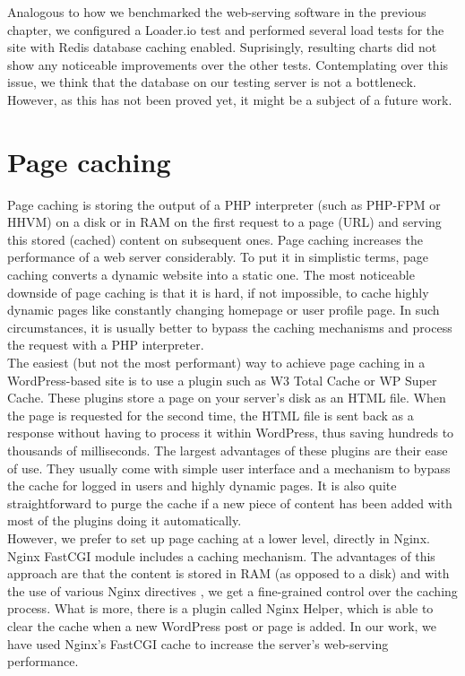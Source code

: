 Analogous to how we benchmarked the web-serving software in the previous chapter, we configured a Loader.io test and performed several load tests for the site with Redis database caching enabled. Suprisingly, resulting charts did not show any noticeable improvements \cite{Loader.io:nginx_hhvm_redis} over the other tests. Contemplating over this issue, we think that the database on our testing server is not a bottleneck. However, as this has not been proved yet, it might be a subject of a future work.

\section{Page caching} \label{page-caching}

Page caching is storing the output of a PHP interpreter (such as PHP-FPM or HHVM) on a disk or in RAM on the first request to a page (URL) and serving this stored (cached) content on subsequent ones. Page caching increases the performance of a web server considerably. To put it in simplistic terms, page caching converts a dynamic website into a static one. The most noticeable downside of page caching is that it is hard, if not impossible, to cache highly dynamic pages like constantly changing homepage or user profile page. In such circumstances, it is usually better to bypass the caching mechanisms and process the request with a PHP interpreter. \\

The easiest (but not the most performant) way to achieve page caching in a WordPress-based site is to use a plugin such as W3 Total Cache or WP Super Cache. These plugins store a page on your server's disk as an HTML file. When the page is requested for the second time, the HTML file is sent back as a response without having to process it within WordPress, thus saving hundreds to thousands of milliseconds. The largest advantages of these plugins are their ease of use. They usually come with simple user interface and a mechanism to bypass the cache for logged in users and highly dynamic pages. It is also quite straightforward to purge the cache if a new piece of content has been added with most of the plugins doing it automatically. \\

However, we prefer to set up page caching at a lower level, directly in Nginx. Nginx FastCGI module \cite{Nginx:FastCGI-module} includes a caching mechanism. The advantages of this approach are that the content is stored in RAM (as opposed to a disk) and with the use of various Nginx directives \cite{Nginx:directives}, we get a fine-grained control over the caching process. What is more, there is a plugin called Nginx Helper, which is able to clear the cache when a new WordPress post or page is added. In our work, we have used Nginx's FastCGI cache to increase the server's web-serving performance. \\

